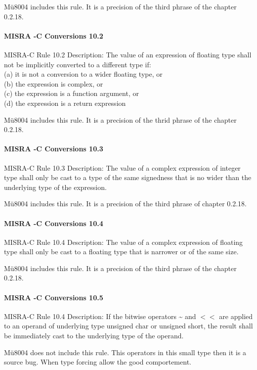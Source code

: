 Mü8004 includes this rule. It is a precision of the third phrase of the chapter 0.2.18.

\paragraph{MISRA -C Conversions 10.2}
MISRA-C Rule 10.2 Description: The value of an expression of floating type shall not be implicitly
converted to a different type if:\\
(a) it is not a conversion to a wider floating type, or\\
(b) the expression is complex, or\\
(c) the expression is a function argument, or\\
(d) the expression is a return expression

Mü8004 includes this rule. It is a precision of the thrid phrase of the chapter 0.2.18.

\paragraph{MISRA -C Conversions 10.3}
MISRA-C Rule 10.3 Description: The value of a complex expression of integer type shall only be
cast to a type of the same signedness that is no wider than the
underlying type of the expression.

Mü8004 includes this rule. It is a precision of the third phrase of chapter 0.2.18.

\paragraph{MISRA -C Conversions 10.4}
MISRA-C Rule 10.4 Description: The value of a complex expression of floating type shall only be cast to a floating type that is narrower or of the same size.

Mü8004 includes this rule. It is a precision of the third phrase of the chapter 0.2.18.

\paragraph{MISRA -C Conversions 10.5}
MISRA-C Rule 10.4 Description: If the bitwise operators
\~{} and $<<$ are applied to an operand of underlying type
unsigned char or unsigned short, the result shall
be immediately cast to the underlying type of the operand.

Mü8004 does not include this rule. This operators in this small type then it is a source bug. When type forcing allow the good comportement.

